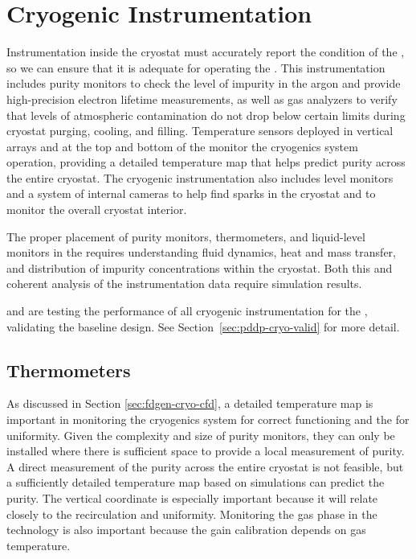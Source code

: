 \section{Cryogenic Instrumentation}
\label{sec:fdgen-cryo-instr}
Instrumentation inside the cryostat must accurately report the condition of the , so we can ensure that it is adequate for operating the .
This instrumentation includes %
purity monitors %
to check the level of impurity in the argon and %
provide high-precision electron lifetime measurements,
as well as gas analyzers to verify that levels of atmospheric contamination do not drop below certain limits during cryostat purging, cooling, and filling. 
Temperature sensors deployed in vertical arrays and at the top and bottom of the  monitor the cryogenics system operation, providing a 
detailed \threed temperature map that helps predict \lar purity across the entire cryostat. The cryogenic instrumentation also includes \lar level monitors and
a system of internal cameras to help find sparks in the cryostat and %
to monitor the overall cryostat interior. 

The proper placement of purity monitors, thermometers, and liquid-level monitors in the  requires %
understanding \lar fluid dynamics, heat and mass transfer, and distribution of impurity concentrations within the cryostat. %
Both this and %
coherent analysis of the instrumentation data require  simulation results.


 and  are testing the performance of all cryogenic instrumentation for the , validating the baseline  %
design. See Section~\ref{sec:pddp-cryo-valid} for more detail. 


\subsection{Thermometers}
\label{sec:fddp-cryo-therm}



As discussed in Section \ref{sec:fdgen-cryo-cfd}, a detailed \threed temperature map is important %
in monitoring %
the cryogenics system for correct functioning and the \lar for uniformity.
Given the complexity and size of purity monitors, they can only be installed where there is sufficient space to provide a local measurement of
\lar purity. 
A direct measurement of the  purity across the entire cryostat is not feasible, but a sufficiently detailed \threed temperature map based on  simulations can predict the purity. The vertical coordinate is especially important because it will relate closely to the 
 recirculation and uniformity. Monitoring the gas phase in the  technology is also important because the  gain calibration depends on gas temperature. 

